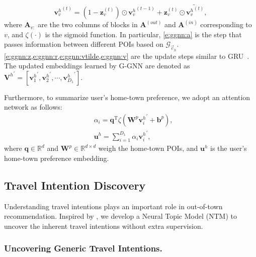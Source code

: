 \documentclass[letterpaper]{article} %
\begin{document}
\begin{equation} \label{e:ggnn:v}
  {\mathbf{v}_v^h}^{(t)} = (1 - \mathbf{z}_v^{(t)}) \odot {\mathbf{v}_v^h}^{(t-1)}
  										 + \mathbf{z}_v^{(t)}   \odot
  						  \widetilde{{\mathbf{v}_v^h}^{(t)}} ,
\end{equation}
where $\mathbf{A}_{v:}$ are the two columns of blocks in $\mathbf{A}^{(out)}$ and $\mathbf{A}^{(in)}$ corresponding to $v$, and $\zeta(\cdot)$ is the sigmoid function.
In particular, \cref{e:ggnn:a} is the step that passes information between different POIs based on $\mathcal{G}_{\vec{c}_h}$.
\cref{e:ggnn:z,e:ggnn:r,e:ggnn:vtilde,e:ggnn:v} are the update steps similar to GRU~\cite{cho2014properties}.
The updated embeddings learned by G-GNN are denoted as
${\mathbf{V}^h}^{\prime} = \left[ {\mathbf{v}^h_1}^{\prime}, {\mathbf{v}^h_2}^{\prime}, \cdots, {\mathbf{v}^h_{D_1}}^{\prime} \right] $.

Furthermore, to summarize user's home-town preference, we adopt an attention network as follows:
\begin{equation} \label{e:home_preference}
    \begin{split}
        &\alpha_i = \mathbf{q}^{\mathrm{T}}
        \zeta\left(\mathbf{W}^p {\mathbf{v}^h_i}^{\prime} + \bm{b}^p \right)  ,
        \\
        &\mathbf{u}^h = \sum_{i=1}^{D_1}
        \alpha_i {\mathbf{v}^h_i}^{\prime}  ,
    \end{split}
\end{equation}
where $\mathbf{q} \in \mathbb{R}^d$ and $\mathbf{W}^p \in \mathbb{R}^{d \times d}$ weigh the home-town POIs,
and $\mathbf{u}^h$ is the user's home-town preference embedding.


\subsection{Travel Intention Discovery}
Understanding travel intentions plays an important role in out-of-town recommendation.
Inspired by \cite{miao2017discovering,srivastava2017autoencoding}, we develop a Neural Topic Model (NTM) to uncover the inherent travel intentions without extra supervision.

\subsubsection{Uncovering Generic Travel Intentions.}
\end{document}
